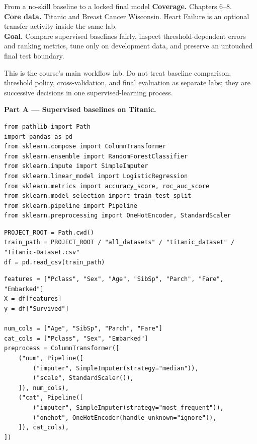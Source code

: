 
\begin{labproject}{From a no-skill baseline to a locked final model}
\textbf{Coverage.} Chapters 6--8.\\
\textbf{Core data.} Titanic and Breast Cancer Wisconsin. Heart Failure is an optional transfer activity inside the same lab.\\
\textbf{Goal.} Compare supervised baselines fairly, inspect threshold-dependent errors and ranking metrics, tune only on development data, and preserve an untouched final test boundary.

\begin{labmode}
This is the course's main workflow lab. Do not treat baseline comparison, threshold policy, cross-validation, and final evaluation as separate labs; they are successive decisions in one supervised-learning process.
\end{labmode}

\medskip\noindent\textbf{Part A --- Supervised baselines on Titanic.}\par
\begin{lstlisting}[style=mlpython]
from pathlib import Path
import pandas as pd
from sklearn.compose import ColumnTransformer
from sklearn.ensemble import RandomForestClassifier
from sklearn.impute import SimpleImputer
from sklearn.linear_model import LogisticRegression
from sklearn.metrics import accuracy_score, roc_auc_score
from sklearn.model_selection import train_test_split
from sklearn.pipeline import Pipeline
from sklearn.preprocessing import OneHotEncoder, StandardScaler
\end{lstlisting}

\begin{lstlisting}[style=mlpython]
PROJECT_ROOT = Path.cwd()
train_path = PROJECT_ROOT / "all_datasets" / "titanic_dataset" / "Titanic-Dataset.csv"
df = pd.read_csv(train_path)
\end{lstlisting}

\begin{lstlisting}[style=mlpython]
features = ["Pclass", "Sex", "Age", "SibSp", "Parch", "Fare", "Embarked"]
X = df[features]
y = df["Survived"]

num_cols = ["Age", "SibSp", "Parch", "Fare"]
cat_cols = ["Pclass", "Sex", "Embarked"]
preprocess = ColumnTransformer([
    ("num", Pipeline([
        ("imputer", SimpleImputer(strategy="median")),
        ("scale", StandardScaler()),
    ]), num_cols),
    ("cat", Pipeline([
        ("imputer", SimpleImputer(strategy="most_frequent")),
        ("onehot", OneHotEncoder(handle_unknown="ignore")),
    ]), cat_cols),
])
\end{lstlisting}


\end{labproject}
